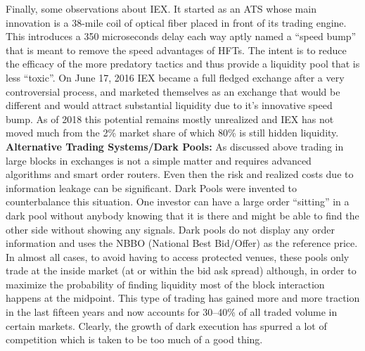 Finally, some observations about IEX. It started as an ATS whose main innovation is a 38-mile coil of optical fiber placed in front of its trading engine. This introduces a 350 microseconds delay each way aptly named a ``speed bump'' that is meant to remove the speed advantages of HFTs. The intent is to reduce the efficacy of the more predatory tactics and thus provide a liquidity pool that is less ``toxic''. On June 17, 2016 IEX became a full fledged exchange after a very controversial process, and marketed themselves as an exchange that would be different and would attract substantial liquidity due to it's innovative speed bump. As of 2018 this potential remains mostly unrealized and IEX has not moved much from the 2\% market share of which 80\% is still hidden liquidity. \\



\noindent\textbf{Alternative Trading Systems/Dark Pools:} As discussed above trading in large blocks in exchanges is not a simple matter and requires advanced algorithms and smart order routers. Even then the risk and realized costs due to information leakage can be significant. Dark Pools were invented to counterbalance this situation. One investor can have a large order ``sitting'' in a dark pool without anybody knowing that it is there and might be able to find the other side without showing any signals. Dark pools do not display any order information and uses the NBBO (National Best Bid/Offer) as the reference price. In almost all cases, to avoid having to access protected venues, these pools only trade at the inside market (at or within the bid ask spread) although, in order to maximize the probability of finding liquidity most of the block interaction happens at the midpoint. This type of trading has gained more and more traction in the last fifteen years and now accounts for 30--40\% of all traded volume in certain markets. Clearly, the growth of dark execution has spurred a lot of competition which is taken to be too much of a good thing. 



